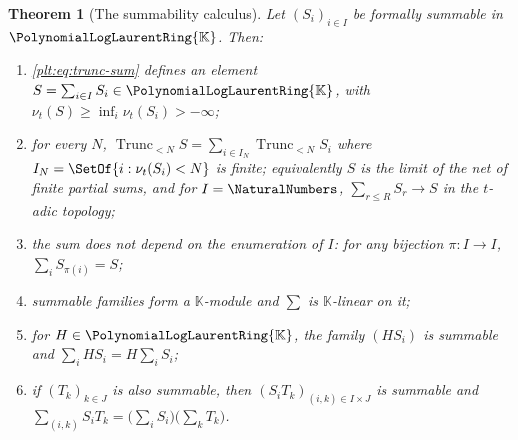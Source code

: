 \documentclass[11pt,oneside]{article}
\theoremstyle{plain}
\newtheorem{theorem}{Theorem}[section]
\theoremstyle{definition}
\theoremstyle{remark}
\newcommand{\K}{\mathbb{K}}
\newcommand{\PLlau}{\PolynomialLogLaurentRing{\K}}       %
\newcommand{\ordt}{\nu_{t}}                              %
\newcommand{\Trunc}[2]{\operatorname{Trunc}_{<#2}#1}     %
\begin{document}
\begin{theorem}[The summability calculus]
\label{plt:thm:trunc-summability}
Let \((S_i)_{i\in I}\) be formally summable in \(\PLlau\).  Then:
\begin{enumerate}[label=\textup{(\roman*)}]
\item \eqref{plt:eq:trunc-sum} defines an element
  \(S=\sum_{i\in I}S_i\in\PLlau\), with
  \(\ordt(S)\ge\inf_i\ordt(S_i)>-\infty\);
\item for every \(N\), \(\Trunc{S}{N}=\sum_{i\in I_N}\Trunc{S_i}{N}\) where
  \(I_N=\SetOf{i:\ordt(S_i)<N}\) is finite; equivalently \(S\) is the limit of
  the net of finite partial sums, and for \(I=\NaturalNumbers\),
  \(\sum_{r\le R}S_r\to S\) in the \(t\)-adic topology;
\item the sum does not depend on the enumeration of \(I\): for any bijection
  \(\pi:I\to I\), \(\sum_iS_{\pi(i)}=S\);
\item summable families form a \(\K\)-module and \(\sum\) is \(\K\)-linear on
  it;
\item for \(H\in\PLlau\), the family \((HS_i)\) is summable and
  \(\sum_i HS_i=H\sum_iS_i\);
\item if \((T_k)_{k\in J}\) is also summable, then \((S_iT_k)_{(i,k)\in I\times
  J}\) is summable and
  \(\sum_{(i,k)}S_iT_k=\bigl(\sum_iS_i\bigr)\bigl(\sum_kT_k\bigr)\).
\end{enumerate}
\end{theorem}
\end{document}
